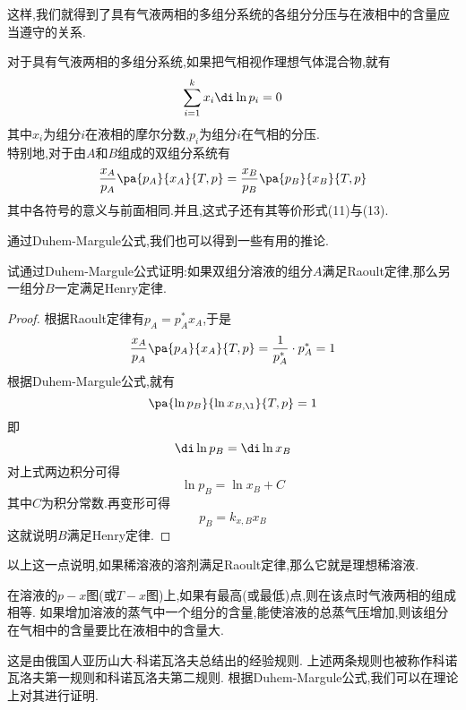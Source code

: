 \documentclass{ctexart}
\begin{document}
这样,我们就得到了具有气液两相的多组分系统的各组分分压与在液相中的含量应当遵守的关系.
\begin{theorem}
    对于具有气液两相的多组分系统,如果把气相视作理想气体混合物,就有
    \[\sum_{i=1}^kx_{i}\di\ln p_i=0\]
    其中$x_i$为组分$i$在液相的摩尔分数,$p_i$为组分$i$在气相的分压.\\
    特别地,对于由$A$和$B$组成的双组分系统有
    \[\dfrac{x_{A}}{p_A}\pa{p_A}{x_{A}}{T,p}=\dfrac{x_{B}}{p_B}\pa{p_B}{x_{B}}{T,p}\]
    其中各符号的意义与前面相同.并且,这式子还有其等价形式(11)与(13).
\end{theorem}
通过Duhem-Margule公式,我们也可以得到一些有用的推论.
\begin{problem}[4C.4.2]
    试通过Duhem-Margule公式证明:如果双组分溶液的组分$A$满足Raoult定律,那么另一组分$B$一定满足Henry定律.
\end{problem}
\begin{proof}
    根据Raoult定律有$p_A=p_A^\ast x_A$,于是
    \[\dfrac{x_{A}}{p_A}\pa{p_A}{x_{A}}{T,p}=\dfrac{1}{p_A^\ast}\cdot p_{A}^\ast=1\]
    根据Duhem-Margule公式,就有
    \[\pa{\ln p_B}{\ln x_{B,\l}}{T,p}=1\]
    即
    \[\di\ln p_B=\di\ln x_B\]
    对上式两边积分可得
    \[\ln p_B=\ln x_B+C\]
    其中$C$为积分常数.再变形可得
    \[p_B=k_{x,B}x_{B}\]
    这就说明$B$满足Henry定律.
\end{proof}
以上这一点说明,如果稀溶液的溶剂满足Raoult定律,那么它就是理想稀溶液.
\begin{theorem}[4C.4.3 科诺瓦洛夫规则]
    在溶液的$p-x$图(或$T-x$图)上,如果有最高(或最低)点,则在该点时气液两相的组成相等.%
    如果增加溶液的蒸气中一个组分的含量,能使溶液的总蒸气压增加,则该组分在气相中的含量要比在液相中的含量大.%
\end{theorem}
这是由俄国人亚历山大$\cdot$科诺瓦洛夫总结出的经验规则.%
上述两条规则也被称作科诺瓦洛夫第一规则和科诺瓦洛夫第二规则.%
根据Duhem-Margule公式,我们可以在理论上对其进行证明.
\end{document}
